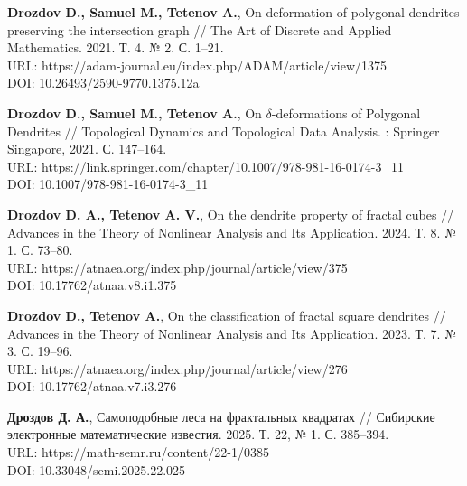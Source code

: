 \documentclass[a4paper,14pt,twoside]{extarticle} %
\begin{document}
\thispagestyle{empty}



\begin{thebibliography}{9}

{\bf Drozdov D., Samuel M., Tetenov A.},
On deformation of polygonal dendrites preserving the intersection graph //
The Art of Discrete and Applied Mathematics. 2021. Т. 4. № 2. С. 1--21.\\
URL: https://adam-journal.eu/index.php/ADAM/article/view/1375\\
DOI: 10.26493/2590-9770.1375.12a

{\bf Drozdov D., Samuel M., Tetenov A.},
On $\delta$-deformations of Polygonal Dendrites //
Topological Dynamics and Topological Data Analysis. : Springer Singapore, 2021. С. 147--164.\\
URL: https://link.springer.com/chapter/10.1007/978-981-16-0174-3\_11\\
DOI: 10.1007/978-981-16-0174-3\_11

{\bf Drozdov D. A., Tetenov A. V.}, On the dendrite property of fractal cubes // Advances in the Theory of Nonlinear Analysis and Its Application. 2024. Т. 8. № 1. С. 73--80.\\
URL: https://atnaea.org/index.php/journal/article/view/375\\
DOI: 10.17762/atnaa.v8.i1.375


{\bf Drozdov D., Tetenov A.},
On the classification of fractal square dendrites //
Advances in the Theory of Nonlinear Analysis and Its Application. 2023. Т. 7. № 3. С. 19--96.\\
URL: https://atnaea.org/index.php/journal/article/view/276\\
DOI: 10.17762/atnaa.v7.i3.276

{\bf Дроздов Д. А.}, 
Самоподобные леса на фрактальных квадратах // Сибирские электронные математические известия. 2025. Т. 22, № 1. С. 385--394.\\
URL: https://math-semr.ru/content/22-1/0385\\
DOI: 10.33048/semi.2025.22.025



\end{thebibliography}
\end{document}
